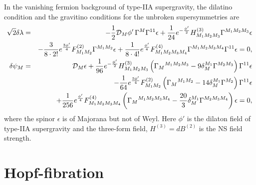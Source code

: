 \documentclass[a4paper,12pt]{article}
\begin{document}
\begin{appendix}
In the vanishing fermion background of type-IIA supergravity, the dilatino condition and the gravitino conditions for the unbroken supersymmetries are
\begin{eqnarray}
\sqrt{2}\delta\lambda&=&-\frac{1}{2}{\cal D}_M\phi'\,\Gamma^M\Gamma^{11}\epsilon+\frac{1}{24}e^{-\frac{\phi'}{2}}H^{(3)}_{M_1M_2M_3}\Gamma^{M_1M_2M_3}\epsilon\nonumber\\
&&-\frac{3}{8\cdot 2!}e^{\frac{3\phi'}{4}}F^{(2)}_{M_1M_2}\Gamma^{M_1M_2}\epsilon+\frac{1}{8\cdot 4!}e^{\frac{\phi'}{4}}F^{(4)}_{M_1M_2M_3M_4}\Gamma^{M_1M_2M_3M_4}\Gamma^{11}\epsilon=0,\nonumber\\
\delta\psi_M&=&{\cal D}_M\epsilon+\frac{1}{96}e^{-\frac{\phi'}{2}}H^{(3)}_{M_1M_2M_3}\left(\Gamma_M{}^{M_1M_2M_3}-9\delta_M^{M_1}\Gamma^{M_2M_3}\right)\Gamma^{11}\epsilon\nonumber\\
&&-\frac{1}{64}e^{\frac{3\phi'}{4}}F^{(2)}_{M_1M_2}\left(\Gamma_M{}^{M_1M_2}-14\delta_M^{M_1}\Gamma^{M_2}\right)\Gamma^{11}\epsilon\nonumber\\
&&+\frac{1}{256}e^{\frac{\phi'}{4}}F^{(4)}_{M_1M_2M_3M_4}\left(\Gamma_M{}^{M_1M_2M_3M_4}-\frac{20}{3}\delta_M^{M_1}\Gamma^{M_2M_3M_4}\right)\epsilon=0,
\end{eqnarray}
where the spinor $\epsilon$ is of Majorana but not of Weyl. Here $\phi'$ is the dilaton field of type-IIA supergravity and the three-form field, $H^{(3)}=dB^{(2)}$ is the NS field strength.

\section{Hopf-fibration}\label{hopf}


\end{appendix}
\end{document}
